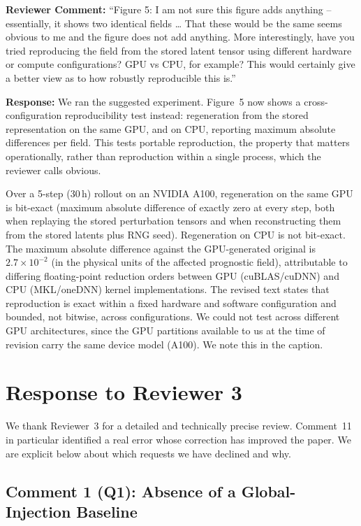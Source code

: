 \documentclass[12pt]{article}
\begin{document}
\textbf{Reviewer Comment:} ``Figure 5: I am not sure this figure adds anything --
essentially, it shows two identical fields \ldots{} That these would be the same seems
obvious to me and the figure does not add anything. More interestingly, have you tried
reproducing the field from the stored latent tensor using different hardware or
compute configurations? GPU vs CPU, for example? This would certainly give a better
view as to how robustly reproducible this is.''

\textbf{Response:} We ran the suggested experiment. Figure~5 now shows a
cross-configuration reproducibility test instead: regeneration
from the stored representation on the same GPU, and on CPU, reporting
maximum absolute differences per field. This tests portable reproduction, the property
that matters operationally, rather than reproduction within a single process, which
the reviewer calls obvious.

Over a 5-step (30\,h) rollout on an NVIDIA A100, regeneration
on the same GPU is bit-exact (maximum absolute difference of exactly zero at every
step, both when replaying the stored perturbation tensors and when reconstructing
them from the stored latents plus RNG seed). Regeneration on CPU is not bit-exact.
The maximum absolute difference against the GPU-generated original is $2.7\times
10^{-2}$ (in the physical units of the affected prognostic field), attributable to
differing floating-point reduction orders between GPU (cuBLAS/cuDNN) and CPU
(MKL/oneDNN) kernel implementations. The revised text states that
reproduction is exact within a fixed hardware and software configuration and bounded,
not bitwise, across configurations. We could not test across different GPU
architectures, since the GPU partitions available to us at the time of revision carry
the same device model (A100). We note this in the caption.

\section*{Response to Reviewer 3}

We thank Reviewer~3 for a detailed and technically precise review.
Comment~11 in particular identified a real error whose correction has improved the
paper. We are explicit below about which requests we have declined and why.

\subsection*{Comment 1 (Q1): Absence of a Global-Injection Baseline}
\end{document}
